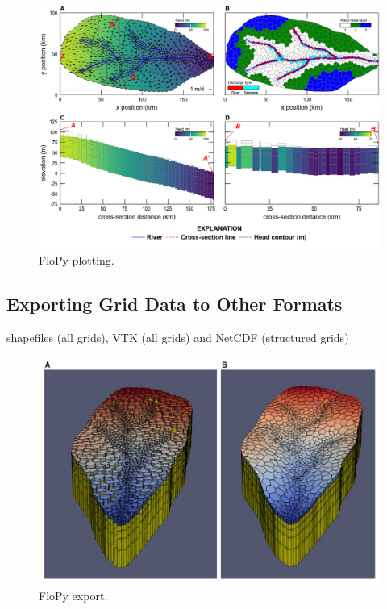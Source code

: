 \documentclass[11pt, oneside]{article}   	%
\begin{document}
\begin{figure}[ht!]
	\begin{center}
		\includegraphics{figures/grids_flopy_plots.png}
	\end{center}
	\caption{FloPy plotting.}
	\label{fig:flopyplots}
\end{figure}

\lipsum[2-4]

\subsection{Exporting Grid Data to Other Formats}

shapefiles (all grids), VTK (all grids) and NetCDF (structured grids)

\lipsum[2-6]

\begin{figure}[ht!]
	\begin{center}
		\includegraphics{figures/mf6vtk.pdf}
	\end{center}
	\caption{FloPy export.}
	\label{fig:flopyvtk}
\end{figure}
\end{document}
